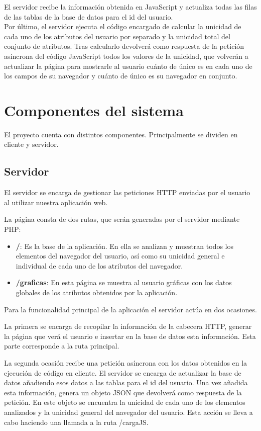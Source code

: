El servidor recibe la información obtenida en JavaScript y actualiza todas las filas de las tablas de la base de datos para el id del usuario. \\
Por último, el servidor ejecuta el código encargado de calcular la unicidad de cada uno de los atributos del usuario por separado y la unicidad total del conjunto de atributos. Tras calcularlo devolverá como respuesta de la petición asíncrona del código JavaScript todos los valores de la unicidad, que volverán a actualizar la página para mostrarle al usuario cuánto de único es en cada uno de los campos de su navegador y cuánto de único es su navegador en conjunto.
\section{Componentes del sistema}
El proyecto cuenta con distintos componentes. Principalmente se dividen en cliente y servidor.
\subsection{Servidor}
El servidor se encarga de gestionar las peticiones HTTP enviadas por el usuario al utilizar nuestra aplicación web.\par
La página consta de dos rutas, que serán generadas por el servidor mediante PHP:
\begin{itemize}
    \item \textbf{/}: Es la base de la aplicación. En ella se analizan y muestran todos los elementos del navegador del usuario, así como su unicidad general e individual de cada uno de los atributos del navegador.
    \item \textbf{/graficas}: En esta página se muestra al usuario gráficas con los datos globales de los atributos obtenidos por la aplicación.
\end{itemize}
Para la funcionalidad principal de la aplicación el servidor actúa en dos ocasiones. \par
La primera se encarga de recopilar la información de la cabecera HTTP, generar la página que verá el usuario e insertar en la base de datos esta información. Esta parte corresponde a la ruta principal. \par 
La segunda ocasión recibe una petición asíncrona con los datos obtenidos en la ejecución de código en cliente. El servidor se encarga de actualizar la base de datos añadiendo esos datos a las tablas para el id del usuario. Una vez añadida esta información, genera un objeto JSON que devolverá como respuesta de la petición. En este objeto se encuentra la unicidad de cada uno de los elementos analizados y la unicidad general del navegador del usuario. Esta acción se lleva a cabo haciendo una llamada a la ruta /cargaJS.
